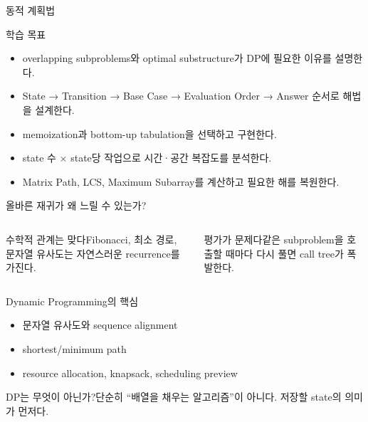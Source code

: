 \begin{frame}[plain]
\vfill{\color{AlgoBlue}동적 계획법\par}
\vspace{1mm}{\Large Dynamic Programming\par}
\vspace{3mm}{\color{AlgoOrange}\rule{38mm}{1.2pt}\par}
\vspace{5mm}{\large 중복되는 부분 문제에서 최적해까지\par}
\vspace{8mm}{\small Algorithm Lecture Notes\par}\vfill
\end{frame}
\begin{frame}{학습 목표}
\begin{itemize}
\item overlapping subproblems와 optimal substructure가 DP에 필요한 이유를 설명한다.
\item State → Transition → Base Case → Evaluation Order → Answer 순서로 해법을 설계한다.
\item memoization과 bottom-up tabulation을 선택하고 구현한다.
\item state 수 × state당 작업으로 시간·공간 복잡도를 분석한다.
\item Matrix Path, LCS, Maximum Subarray를 계산하고 필요한 해를 복원한다.
\end{itemize}
\end{frame}
\begin{frame}{올바른 재귀가 왜 느릴 수 있는가?}
\begin{columns}[T]
\begin{block}{수학적 관계는 맞다}Fibonacci, 최소 경로, 문자열 유사도는 자연스러운 recurrence를 가진다.\end{block}
\begin{alertblock}{평가가 문제다}같은 subproblem을 호출할 때마다 다시 풀면 call tree가 폭발한다.\end{alertblock}
\end{columns}
\end{frame}
\begin{frame}{Dynamic Programming의 핵심}
\begin{itemize}\item 문자열 유사도와 sequence alignment\item shortest/minimum path\item resource allocation, knapsack, scheduling preview\end{itemize}
\begin{alertblock}{DP는 무엇이 아닌가?}단순히 “배열을 채우는 알고리즘”이 아니다. 저장할 \alert{state의 의미}가 먼저다.\end{alertblock}
\end{frame}

